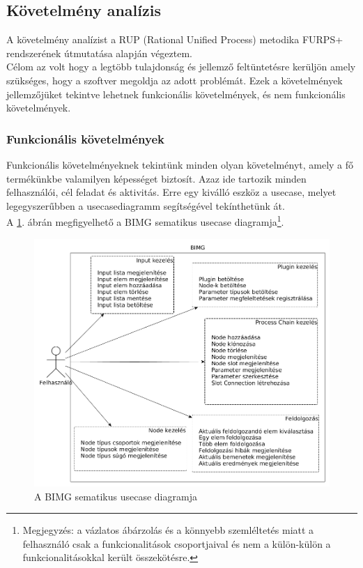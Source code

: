 \documentclass[a4paper,12pt,oneside]{report}
\begin{document}
\subsection{Követelmény analízis}
A követelmény analízist a RUP (Rational Unified Process) metodika FURPS+ rendszerének útmutatása alapján végeztem. \\Célom az volt hogy a legtöbb tulajdonság és jellemző feltüntetésre kerüljön amely szükséges, hogy a szoftver megoldja az adott problémát. \cite{website:soft_req_def} Ezek a követelmények jellemzőjüket tekintve lehetnek funkcionális követelmények, és nem funkcionális követelmények.

\subsubsection{Funkcionális követelmények}
Funkcionális követelményeknek tekintünk minden olyan követelményt, amely a fő termékünkbe valamilyen képességet biztosít. \cite{website:soft_func_req_ibm} Azaz ide tartozik minden felhasználói, cél feladat és aktivitás. Erre egy kiválló eszköz a usecase, melyet legegyszerűbben a usecasediagramm segítségével tekínthetünk át.
\\
A \ref{fig:bimg_usecase_schema}. ábrán megfigyelhető a BIMG sematikus usecase diagramja\footnote{Megjegyzés: a vázlatos ábárzolás és a könnyebb szemléltetés miatt a felhasználó csak a funkcionalitások csoportjaival és nem a külön-külön a funkcionalitásokkal került összekötésre.}.
\begin{figure}[h]
  \includegraphics[width=\textwidth]{schematic_usecase.png}
  \caption{A BIMG sematikus usecase diagramja }
  \label{fig:bimg_usecase_schema}
\end{figure}
\end{document}
